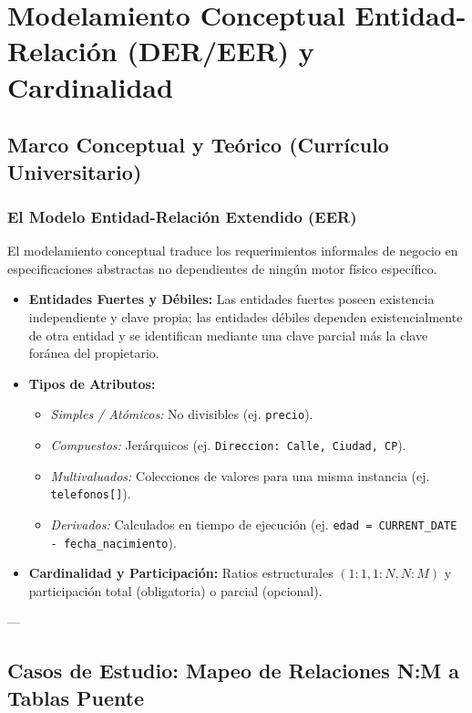 \chapter{Modelamiento Conceptual Entidad-Relaci\'on (DER/EER) y Cardinalidad}
\label{cap:modelamiento_conceptual_der}

\section{Marco Conceptual y Te\'orico (Curr\'iculo Universitario)}

\subsection{El Modelo Entidad-Relaci\'on Extendido (EER)}
El modelamiento conceptual traduce los requerimientos informales de negocio en especificaciones abstractas no dependientes de ning\'un motor f\'isico espec\'ifico.

\begin{itemize}
    \item \textbf{Entidades Fuertes y D\'ebiles:} Las entidades fuertes poseen existencia independiente y clave propia; las entidades d\'ebiles dependen existencialmente de otra entidad y se identifican mediante una clave parcial m\'as la clave for\'anea del propietario.
    \item \textbf{Tipos de Atributos:}
    \begin{itemize}
        \item \textit{Simples / At\'omicos:} No divisibles (ej. \texttt{precio}).
        \item \textit{Compuestos:} Jer\'arquicos (ej. \texttt{Direccion: Calle, Ciudad, CP}).
        \item \textit{Multivaluados:} Colecciones de valores para una misma instancia (ej. \texttt{telefonos[]}).
        \item \textit{Derivados:} Calculados en tiempo de ejecuci\'on (ej. \texttt{edad = CURRENT\_DATE - fecha\_nacimiento}).
    \end{itemize}
    \item \textbf{Cardinalidad y Participaci\'on:} Ratios estructurales $(1:1, 1:N, N:M)$ y participaci\'on total (obligatoria) o parcial (opcional).
\end{itemize}

---

\section{Casos de Estudio: Mapeo de Relaciones N:M a Tablas Puente}

